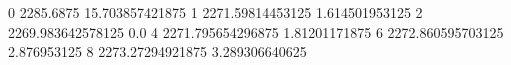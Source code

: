 0 2285.6875 15.703857421875
1 2271.59814453125 1.614501953125
2 2269.983642578125 0.0
4 2271.795654296875 1.81201171875
6 2272.860595703125 2.876953125
8 2273.27294921875 3.289306640625
